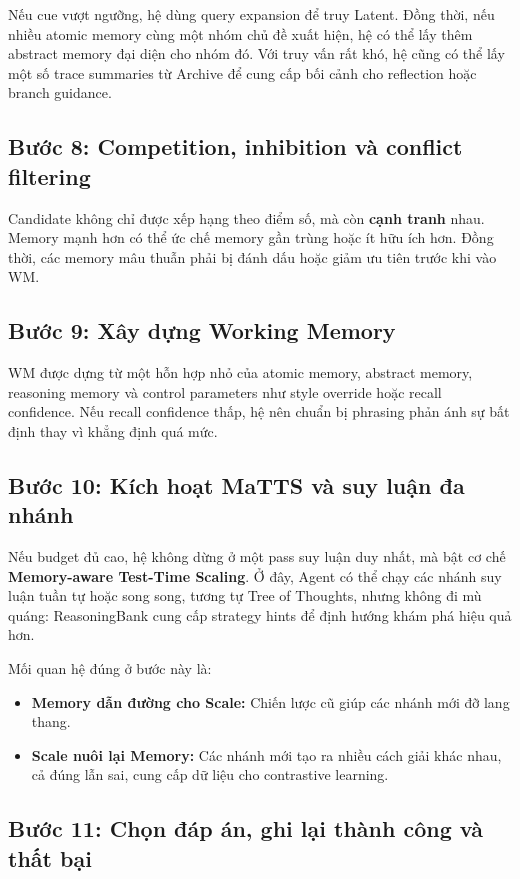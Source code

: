 \documentclass[a4paper,12pt]{article}
\begin{document}
Nếu cue vượt ngưỡng, hệ dùng query expansion để truy Latent. Đồng thời, nếu nhiều atomic memory cùng một nhóm chủ đề xuất hiện, hệ có thể lấy thêm abstract memory đại diện cho nhóm đó. Với truy vấn rất khó, hệ cũng có thể lấy một số trace summaries từ Archive để cung cấp bối cảnh cho reflection hoặc branch guidance.

\subsection*{Bước 8: Competition, inhibition và conflict filtering}

Candidate không chỉ được xếp hạng theo điểm số, mà còn \textbf{cạnh tranh} nhau. Memory mạnh hơn có thể ức chế memory gần trùng hoặc ít hữu ích hơn. Đồng thời, các memory mâu thuẫn phải bị đánh dấu hoặc giảm ưu tiên trước khi vào WM.

\subsection*{Bước 9: Xây dựng Working Memory}

WM được dựng từ một hỗn hợp nhỏ của atomic memory, abstract memory, reasoning memory và control parameters như style override hoặc recall confidence. Nếu recall confidence thấp, hệ nên chuẩn bị phrasing phản ánh sự bất định thay vì khẳng định quá mức.

\subsection*{Bước 10: Kích hoạt MaTTS và suy luận đa nhánh}

Nếu budget đủ cao, hệ không dừng ở một pass suy luận duy nhất, mà bật cơ chế \textbf{Memory-aware Test-Time Scaling}. Ở đây, Agent có thể chạy các nhánh suy luận tuần tự hoặc song song, tương tự Tree of Thoughts, nhưng không đi mù quáng: ReasoningBank cung cấp strategy hints để định hướng khám phá hiệu quả hơn.

Mối quan hệ đúng ở bước này là:
\begin{itemize}
    \item \textbf{Memory dẫn đường cho Scale:} Chiến lược cũ giúp các nhánh mới đỡ lang thang.
    \item \textbf{Scale nuôi lại Memory:} Các nhánh mới tạo ra nhiều cách giải khác nhau, cả đúng lẫn sai, cung cấp dữ liệu cho contrastive learning.
\end{itemize}

\subsection*{Bước 11: Chọn đáp án, ghi lại thành công và thất bại}
\end{document}
